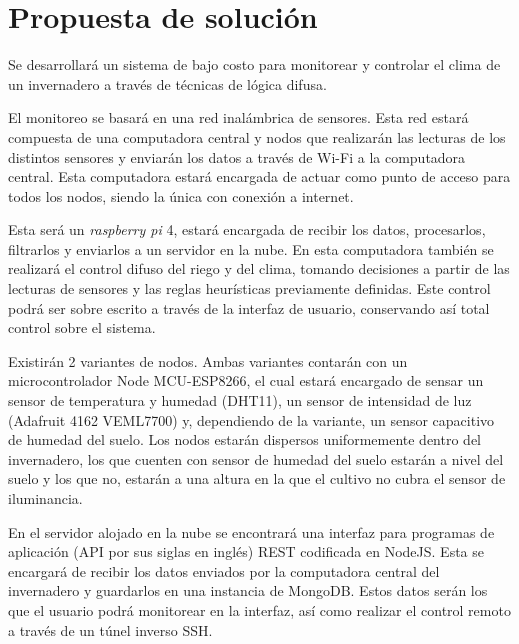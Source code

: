 \section{Propuesta de solución}

Se desarrollará un sistema de bajo costo para monitorear y controlar el clima de un invernadero a través de técnicas de lógica difusa.

El monitoreo se basará en una red inalámbrica de sensores. Esta red estará compuesta de una computadora central y nodos que realizarán las lecturas de los distintos sensores y enviarán los datos a través de Wi-Fi a la computadora central. Esta computadora estará encargada de actuar como punto de acceso para todos los nodos, siendo la única con conexión a internet. 

Esta será un \textit{raspberry pi} 4, estará encargada de recibir los datos, procesarlos, filtrarlos y enviarlos a un servidor en la nube. En esta computadora también se realizará el control difuso del riego y del clima, tomando decisiones a partir de las lecturas de sensores y las reglas heurísticas previamente definidas. Este control podrá ser sobre escrito a través de la interfaz de usuario, conservando así total control sobre el sistema.

Existirán 2 variantes de nodos. Ambas variantes contarán con un microcontrolador Node MCU-ESP8266, el cual estará encargado de sensar un sensor de temperatura y humedad (DHT11), un sensor de intensidad de luz (Adafruit 4162 VEML7700) y, dependiendo de la variante, un sensor capacitivo de humedad del suelo. Los nodos estarán dispersos uniformemente dentro del invernadero, los que cuenten con sensor de humedad del suelo estarán a nivel del suelo y los que no, estarán a una altura en la que el cultivo no cubra el sensor de iluminancia.

En el servidor alojado en la nube se encontrará una interfaz para programas de aplicación (API por sus siglas en inglés) REST codificada en NodeJS. Esta se encargará de recibir los datos enviados por la computadora central del invernadero y guardarlos en una instancia de MongoDB. Estos datos serán los que el usuario podrá monitorear en la interfaz, así como realizar el control remoto a través de un túnel inverso SSH.
